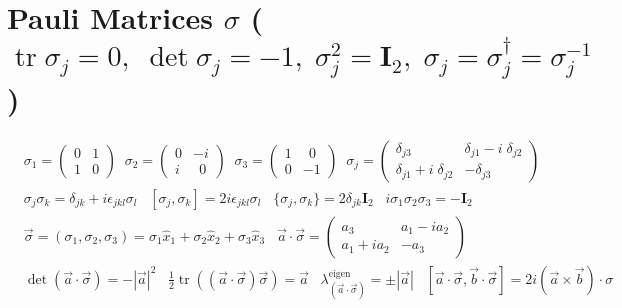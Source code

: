 \section*{Pauli Matrices $\sigma$ (\normalfont\scriptsize{$\operatorname{tr}\sigma_j=0, \; \det\sigma_j =-1, \; 
\sigma_{j}^2 =  \mathbf{I}_2, \; \sigma_j = \sigma_{j}^{\dagger}= \sigma_{j}^{-1}$})}
\begin{align*}   
    &\sigma_1 {= }\begin{pmatrix}0&1\\1&0 
    \end{pmatrix} \; \; 
    \sigma_2 {=} \begin{pmatrix}0&-i\\i&\ \ 0
    \end{pmatrix}\; \;  
    \sigma_3 {=} \begin{pmatrix} 1&\ \ 0\\0&-1
    \end{pmatrix} \; \; \sigma_j {=} \begin{pmatrix}\delta_{j3}&\delta_{j1}\!-\!i\;\!\delta _{j2}
    \\\delta_{j1}\!+\!i\;\!\delta_{j2}&-\delta_{j3}
    \end{pmatrix}\\
    &\sigma_j\sigma_k = \delta_{jk} + i \epsilon_{jkl}\sigma_l\;\;\; [\sigma_j, \sigma_k] = 2i\epsilon_{jkl}\sigma_l \;\;\; \{\sigma_j,\sigma_k\} = 2\delta_{jk}\mathbf{I}_2\; \; \; i\sigma_1\sigma_2\sigma_3 = -\mathbf{I}_2  \\
    &\vec{\sigma} = (\sigma_1, \sigma_2, \sigma_3)=\sigma_1 \hat{x}_1 +\sigma_2 \hat{x}_2 + \sigma_3 \hat{x}_3  \; \; \; \vec{a}\cdot \vec{\sigma} = \begin{pmatrix}
        a_3&a_1-ia_2\\
        a_1+ia_2&-a_3
    \end{pmatrix} \\
    & \det (\vec{a}\cdot \vec{\sigma}) =-|\vec{a}|^2 \;\;\;  \tfrac{1}{2}\operatorname{tr}\left((\vec{a}\cdot \vec{\sigma})\vec{\sigma}\right) = \vec{a} \;\;\; \lambda_{(\vec{a}\cdot\vec{\sigma})}^{\text{eigen}} =\pm |\vec{a}| \;\;\; [\vec{a}\cdot \vec{\sigma}, \vec{b} \cdot \vec{\sigma}] = 2i(\vec{a}\times\vec{b})\!\cdot\! \sigma
\end{align*}
